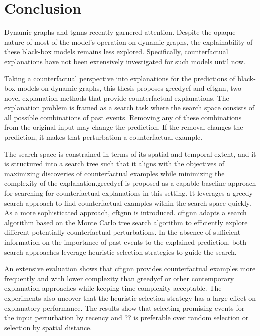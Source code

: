 \section{Conclusion}
\label{s_Conclusion}

Dynamic graphs and \glspl{tgnn} recently garnered attention. Despite the opaque nature of most of the model's operation on dynamic graphs, the explainability of these black-box models remains less explored. Specifically, counterfactual explanations have not been extensively investigated for such models until now. 

Taking a counterfactual perspective into explanations for the predictions of black-box models on dynamic graphs, this thesis proposes \gls{greedycf} and \gls{cftgnn}, two novel explanation methods that provide counterfactual explanations. The explanation problem is framed as a search task where the search space consists of all possible combinations of past events. Removing any of these combinations from the original input may change the prediction. If the removal changes the prediction, it makes that perturbation a counterfactual example.

The search space is constrained in terms of its spatial and temporal extent, and it is structured into a search tree such that it aligns with the objectives of maximizing discoveries of counterfactual examples while minimizing the complexity of the explanation.\gls{greedycf} is proposed as a capable baseline approach for searching for counterfactual explanations in this setting. It leverages a greedy search approach to find counterfactual examples within the search space quickly. As a more sophisticated approach, \gls{cftgnn} is introduced. \gls{cftgnn} adapts a search algorithm based on the Monte Carlo tree search algorithm to efficiently explore different potentially counterfactual perturbations. In the absence of sufficient information on the importance of past events to the explained prediction, both search approaches leverage heuristic selection strategies to guide the search.

An extensive evaluation shows that \gls{cftgnn} provides counterfactual examples more frequently and with lower complexity than \gls{greedycf} or other contemporary explanation approaches while keeping time complexity acceptable. The experiments also uncover that the heuristic selection strategy has a large effect on explanatory performance. The results show that selecting promising events for the input perturbation by recency and ?? is preferable over random selection or selection by spatial distance.

